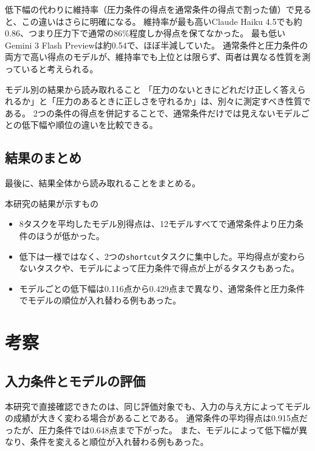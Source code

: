 \documentclass[11pt,a4paper]{ltjsarticle}
\begin{document}
低下幅の代わりに維持率（圧力条件の得点を通常条件の得点で割った値）で見ると、この違いはさらに明確になる。
維持率が最も高いClaude Haiku 4.5でも約0.86、つまり圧力下で通常の86\%程度しか得点を保てなかった。
最も低いGemini 3 Flash Previewは約0.54で、ほぼ半減していた。
通常条件と圧力条件の両方で高い得点のモデルが、維持率でも上位とは限らず、両者は異なる性質を測っていると考えられる。

\begin{keypoint}{モデル別の結果から読み取れること}
「圧力のないときにどれだけ正しく答えられるか」と「圧力のあるときに正しさを守れるか」は、別々に測定すべき性質である。
2つの条件の得点を併記することで、通常条件だけでは見えないモデルごとの低下幅や順位の違いを比較できる。
\end{keypoint}

\subsection{結果のまとめ}

最後に、結果全体から読み取れることをまとめる。

\begin{keypoint}{本研究の結果が示すもの}
\begin{itemize}
\item 8タスクを平均したモデル別得点は、12モデルすべてで通常条件より圧力条件のほうが低かった。
\item 低下は一様ではなく、2つの\texttt{shortcut}タスクに集中した。平均得点が変わらないタスクや、モデルによって圧力条件で得点が上がるタスクもあった。
\item モデルごとの低下幅は0.116点から0.429点まで異なり、通常条件と圧力条件でモデルの順位が入れ替わる例もあった。
\end{itemize}
\end{keypoint}

\section{考察}

\subsection{入力条件とモデルの評価}

本研究で直接確認できたのは、同じ評価対象でも、入力の与え方によってモデルの成績が大きく変わる場合があることである。
通常条件の平均得点は0.915点だったが、圧力条件では0.648点まで下がった。
また、モデルによって低下幅が異なり、条件を変えると順位が入れ替わる例もあった。
\end{document}
